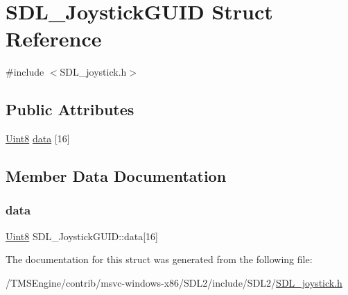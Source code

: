 \hypertarget{struct_s_d_l___joystick_g_u_i_d}{}\section{S\+D\+L\+\_\+\+Joystick\+G\+U\+ID Struct Reference}
\label{struct_s_d_l___joystick_g_u_i_d}


{\ttfamily \#include $<$S\+D\+L\+\_\+joystick.\+h$>$}

\subsection*{Public Attributes}
\begin{DoxyCompactItemize}
\item 
\hyperlink{_s_d_l__stdinc_8h_a2944638813a090aa23e62f4da842c3e2}{Uint8} \hyperlink{struct_s_d_l___joystick_g_u_i_d_a16935b928a608fe98e0509f242590597}{data} \mbox{[}16\mbox{]}
\end{DoxyCompactItemize}


\subsection{Member Data Documentation}
\mbox{\label{struct_s_d_l___joystick_g_u_i_d_a16935b928a608fe98e0509f242590597}} 
\subsubsection{\texorpdfstring{data}{data}}
{\footnotesize\ttfamily \hyperlink{_s_d_l__stdinc_8h_a2944638813a090aa23e62f4da842c3e2}{Uint8} S\+D\+L\+\_\+\+Joystick\+G\+U\+I\+D\+::data\mbox{[}16\mbox{]}}



The documentation for this struct was generated from the following file\+:\begin{DoxyCompactItemize}
\item 
/\+T\+M\+S\+Engine/contrib/msvc-\/windows-\/x86/\+S\+D\+L2/include/\+S\+D\+L2/\hyperlink{_s_d_l__joystick_8h}{S\+D\+L\+\_\+joystick.\+h}\end{DoxyCompactItemize}
